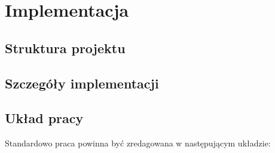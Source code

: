 \chapter{Implementacja}
\label{chap:implementacja}

\section{Struktura projektu}
\label{sec:struktura-projektu}

\section{Szczegóły implementacji}
\label{sec:szczegoly-implementacji}

\section{Układ pracy}
Standardowo praca powinna być zredagowana w następującym układzie:

